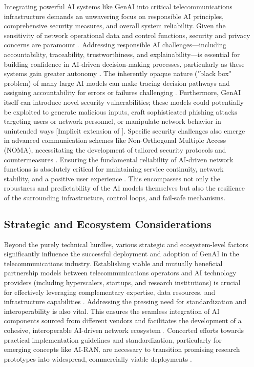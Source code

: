 \documentclass[sigconf]{acmart}
\begin{document}
Integrating powerful AI systems like GenAI into critical telecommunications infrastructure demands an unwavering focus on responsible AI principles, comprehensive security measures, and overall system reliability. Given the sensitivity of network operational data and control functions, security and privacy concerns are paramount \cite{ref12, ref25, ref31, ref34, ref35}. Addressing responsible AI challenges—including accountability, traceability, trustworthiness, and explainability—is essential for building confidence in AI-driven decision-making processes, particularly as these systems gain greater autonomy \cite{ref16}. The inherently opaque nature ("black box" problem) of many large AI models can make tracing decision pathways and assigning accountability for errors or failures challenging \cite{ref16}. Furthermore, GenAI itself can introduce novel security vulnerabilities; these models could potentially be exploited to generate malicious inputs, craft sophisticated phishing attacks targeting users or network personnel, or manipulate network behavior in unintended ways [Implicit extension of \cite{ref20}]. Specific security challenges also emerge in advanced communication schemes like Non-Orthogonal Multiple Access (NOMA), necessitating the development of tailored security protocols and countermeasures \cite{ref30}. Ensuring the fundamental reliability of AI-driven network functions is absolutely critical for maintaining service continuity, network stability, and a positive user experience \cite{ref31, ref34, ref35}. This encompasses not only the robustness and predictability of the AI models themselves but also the resilience of the surrounding infrastructure, control loops, and fail-safe mechanisms.

\subsection{Strategic and Ecosystem Considerations}
\label{sec:strategic_ecosystem}

Beyond the purely technical hurdles, various strategic and ecosystem-level factors significantly influence the successful deployment and adoption of GenAI in the telecommunications industry. Establishing viable and mutually beneficial partnership models between telecommunications operators and AI technology providers (including hyperscalers, startups, and research institutions) is crucial for effectively leveraging complementary expertise, data resources, and infrastructure capabilities \cite{ref3}. Addressing the pressing need for standardization and interoperability is also vital. This ensures the seamless integration of AI components sourced from different vendors and facilitates the development of a cohesive, interoperable AI-driven network ecosystem \cite{ref34}. Concerted efforts towards practical implementation guidelines and standardization, particularly for emerging concepts like AI-RAN, are necessary to transition promising research prototypes into widespread, commercially viable deployments \cite{ref34}.
\end{document}
